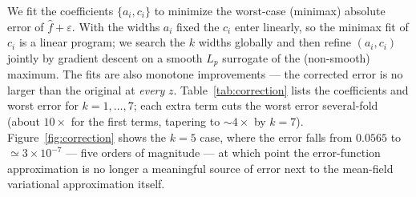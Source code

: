 \documentclass[12pt]{article}
\begin{document}
We fit the coefficients $\{a_i, c_i\}$ to minimize the worst-case (minimax) absolute error of
$\widehat{f} + \varepsilon$. With the widths $a_i$ fixed the $c_i$ enter linearly, so the minimax fit
of $c_i$ is a linear program; we search the $k$ widths globally and then refine $(a_i, c_i)$ jointly by
gradient descent on a smooth $L_p$ surrogate of the (non-smooth) maximum. The fits are also monotone
improvements --- the corrected error is no larger than the original at \emph{every} $z$.
Table~\ref{tab:correction} lists the coefficients and worst error for $k = 1, \dots, 7$; each extra term
cuts the worst error several-fold (about $10\times$ for the first terms, tapering to $\sim\!4\times$ by
$k = 7$). Figure~\ref{fig:correction} shows the $k = 5$
case, where the error falls from $0.0565$ to $\simeq 3\times 10^{-7}$ --- five orders of magnitude --- at
which point the error-function approximation is no longer a meaningful source of error next to the
mean-field variational approximation itself.
\end{document}
